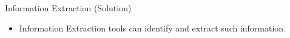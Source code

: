 \documentclass[xcolor=dvipsnames]{beamer}
\begin{document}
\begin{frame}{Information Extraction (Solution)}  
\begin{itemize}
	\item Information Extraction tools can identify and extract such information.
	\bigskip	
	\begin{center}
	\end{center}	
\end{itemize}
\end{frame}
\end{document}
